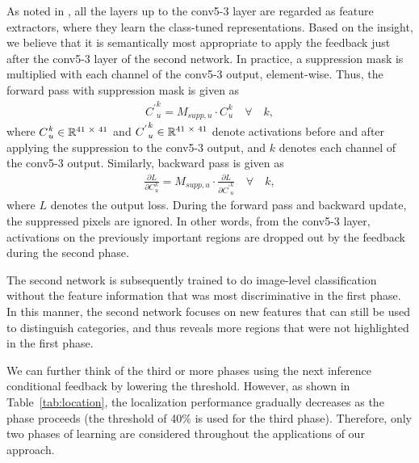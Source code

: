 \documentclass[10pt,twocolumn,letterpaper]{article}
\newcommand{\tabfref}[1]{Table~\ref{#1}}
\begin{document}
As noted in \cite{GirshickDDM14}, all the layers up to the conv5-3 layer are regarded as feature extractors, where they learn the class-tuned representations. %
Based on the insight, we believe that it is semantically most appropriate to apply the feedback just after the conv5-3 layer of the second network. In practice, a suppression mask is multiplied with each channel of the conv5-3 output, element-wise. %
Thus, the forward pass with suppression mask is given as
\begin{eqnarray}{C^{'}}_{u}^{k} = M_{supp,u} \cdot {C^{}}_{u}^{k} \quad \forall \quad{k},
   \label{eq:EltwiseForward}
\end{eqnarray}
where ${C^{}}_{u}^{k}\in \mathbb{R} \textsuperscript{41 $\times$ 41}$ and ${C^{'}}_{u}^{k}\in \mathbb{R} \textsuperscript{41 $\times$ 41}$ denote activations before and after applying the suppression to the conv5-3 output, and $k$ denotes each channel of the conv5-3 output. Similarly, backward pass is given as
\begin{eqnarray}
   \frac{\partial L}{\partial {C^{}}_{u}^{k}} = M_{supp,u} \cdot \frac{\partial L}{\partial {C^{'}}_{u}^{k}} \quad \forall \quad{k},
   \label{eq:EltwiseBackward}
\end{eqnarray}
where $L$ denotes the output loss.
During the forward pass and backward update, the suppressed pixels are ignored. In other words, from the conv5-3 layer, activations on the previously important regions are dropped out by the feedback during the second phase.

The second network is subsequently trained to do image-level classification without the feature information that was most discriminative in the first phase. In this manner, the second network focuses on new features that can still be used to distinguish categories, and thus reveals more regions that were not highlighted in the first phase.


We can further think of the third or more phases using the next inference conditional feedback by lowering the threshold. However, as shown in \tabfref{tab:location}, the localization performance gradually decreases as the phase proceeds (the threshold of 40\% is used for the third phase). Therefore, only two phases of learning are considered throughout the applications of our approach.
\end{document}
